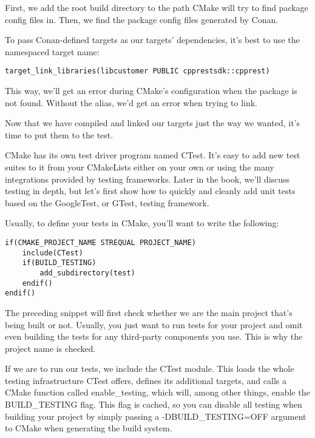 First, we add the root build directory to the path CMake will try to find package config files in. Then, we find the package config files generated by Conan.

To pass Conan-defined targets as our targets' dependencies, it's best to use the namespaced target name:

\begin{lstlisting}[style=styleCMake]
target_link_libraries(libcustomer PUBLIC cpprestsdk::cpprest)
\end{lstlisting}

This way, we'll get an error during CMake's configuration when the package is not found. Without the alias, we'd get an error when trying to link.

Now that we have compiled and linked our targets just the way we wanted, it's time to put them to the test.


CMake has its own test driver program named CTest. It's easy to add new test suites to it from your CMakeLists either on your own or using the many integrations provided by testing frameworks. Later in the book, we'll discuss testing in depth, but let's first show how to quickly and cleanly add unit tests based on the GoogleTest, or GTest, testing framework.

Usually, to define your tests in CMake, you'll want to write the following:

\begin{lstlisting}[style=styleCMake]
if(CMAKE_PROJECT_NAME STREQUAL PROJECT_NAME)
	include(CTest)
	if(BUILD_TESTING)
		add_subdirectory(test)
	endif()
endif()
\end{lstlisting}

The preceding snippet will first check whether we are the main project that's being built or not. Usually, you just want to run tests for your project and omit even building the tests for any third-party components you use. This is why the project name is checked.

If we are to run our tests, we include the CTest module. This loads the whole testing infrastructure CTest offers, defines its additional targets, and calls a CMake function called enable\_testing, which will, among other things, enable the BUILD\_TESTING flag. This flag is cached, so you can disable all testing when building your project by simply passing a -DBUILD\_TESTING=OFF argument to CMake when generating the build system.

